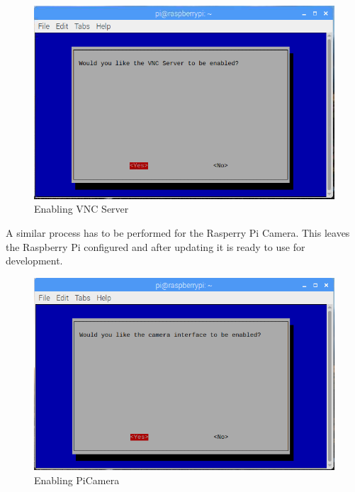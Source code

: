 \documentclass[10pt,a4paper]{article}
\begin{document}
\begin{figure}[H]
\centering
  \includegraphics[width=\linewidth]{images/vncserver.png}
  \caption{Enabling VNC Server}
  \label{fig:vncserver}
\end{figure}

A similar process has to be performed for the Rasperry Pi Camera. This leaves the Raspberry Pi configured and after updating it is ready to use for development.

\begin{figure}[H]
\centering
  \includegraphics[width=\linewidth]{images/picamera.png}
  \caption{Enabling PiCamera}
  \label{fig:picamera}
\end{figure}
\end{document}
